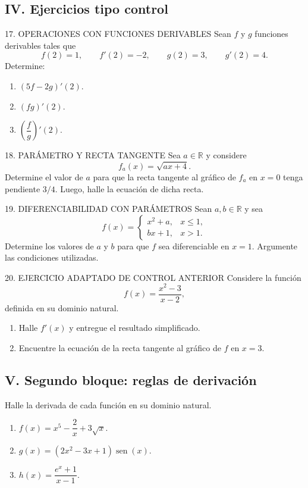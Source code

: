 \documentclass[letterpaper,12pt]{article}
\newcommand{\sen}{\operatorname{sen}}
\newcommand{\R}{\mathbb{R}}
\newcommand{\tituloSeccion}[1]{%
    \needspace{4\baselineskip}
    \subsection*{\color{azulFuerte}#1}
}
\begin{document}
\tituloSeccion{IV. Ejercicios tipo control}

\begin{controlbox}{17. OPERACIONES CON FUNCIONES DERIVABLES}
Sean \(f\) y \(g\) funciones derivables tales que
\[
f(2)=1,\qquad f'(2)=-2,\qquad g(2)=3,\qquad g'(2)=4.
\]
Determine:
\begin{enumerate}[label=\alph*),leftmargin=*]
    \item \((5f-2g)'(2)\).
    \item \((fg)'(2)\).
    \item \(\left(\dfrac{f}{g}\right)'(2)\).
\end{enumerate}
\end{controlbox}

\begin{controlbox}{18. PARÁMETRO Y RECTA TANGENTE}
Sea \(a\in\R\) y considere
\[
f_a(x)=\sqrt{ax+4}.
\]
Determine el valor de \(a\) para que la recta tangente al gráfico de \(f_a\) en \(x=0\) tenga pendiente \(3/4\). Luego, halle la ecuación de dicha recta.
\end{controlbox}

\begin{controlbox}{19. DIFERENCIABILIDAD CON PARÁMETROS}
Sean \(a,b\in\R\) y sea
\[
f(x)=
\begin{cases}
x^2+a, & x\leq1,\\
bx+1, & x>1.
\end{cases}
\]
Determine los valores de \(a\) y \(b\) para que \(f\) sea diferenciable en \(x=1\). Argumente las condiciones utilizadas.
\end{controlbox}

\begin{controlbox}{20. EJERCICIO ADAPTADO DE CONTROL ANTERIOR}
Considere la función
\[
f(x)=\frac{x^2-3}{x-2},
\]
definida en su dominio natural.
\begin{enumerate}[label=\alph*),leftmargin=*]
    \item Halle \(f'(x)\) y entregue el resultado simplificado.
    \item Encuentre la ecuación de la recta tangente al gráfico de \(f\) en \(x=3\).
\end{enumerate}
\end{controlbox}

\tituloSeccion{V. Segundo bloque: reglas de derivación}
\noindent Halle la derivada de cada función en su dominio natural.

\begin{enumerate}[label=\color{azulFuerte}\textbf{\arabic*.},leftmargin=*,start=21,itemsep=1em]
    \item \(f(x)=x^5-\dfrac{2}{x}+3\sqrt{x}.\)

    \item \(g(x)=(2x^2-3x+1)\sen(x).\)

    \item \(h(x)=\dfrac{e^x+1}{x-1}.\)
\end{enumerate}
\end{document}
